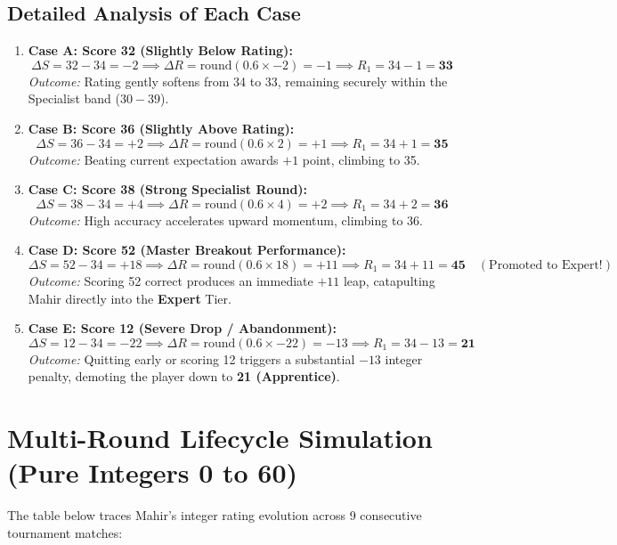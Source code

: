 \subsection{Detailed Analysis of Each Case}
\begin{enumerate}
    \item \textbf{Case A: Score 32 (Slightly Below Rating):}
    $$\Delta S = 32 - 34 = -2 \implies \Delta R = \text{round}(0.6 \times -2) = -1 \implies R_1 = 34 - 1 = \mathbf{33}$$
    \textit{Outcome:} Rating gently softens from 34 to 33, remaining securely within the Specialist band ($30-39$).

    \item \textbf{Case B: Score 36 (Slightly Above Rating):}
    $$\Delta S = 36 - 34 = +2 \implies \Delta R = \text{round}(0.6 \times 2) = +1 \implies R_1 = 34 + 1 = \mathbf{35}$$
    \textit{Outcome:} Beating current expectation awards $+1$ point, climbing to 35.

    \item \textbf{Case C: Score 38 (Strong Specialist Round):}
    $$\Delta S = 38 - 34 = +4 \implies \Delta R = \text{round}(0.6 \times 4) = +2 \implies R_1 = 34 + 2 = \mathbf{36}$$
    \textit{Outcome:} High accuracy accelerates upward momentum, climbing to 36.

    \item \textbf{Case D: Score 52 (Master Breakout Performance):}
    $$\Delta S = 52 - 34 = +18 \implies \Delta R = \text{round}(0.6 \times 18) = +11 \implies R_1 = 34 + 11 = \mathbf{45} \quad (\text{Promoted to Expert!})$$
    \textit{Outcome:} Scoring 52 correct produces an immediate $+11$ leap, catapulting Mahir directly into the \textbf{Expert} Tier.

    \item \textbf{Case E: Score 12 (Severe Drop / Abandonment):}
    $$\Delta S = 12 - 34 = -22 \implies \Delta R = \text{round}(0.6 \times -22) = -13 \implies R_1 = 34 - 13 = \mathbf{21}$$
    \textit{Outcome:} Quitting early or scoring 12 triggers a substantial $-13$ integer penalty, demoting the player down to \textbf{21 (Apprentice)}.
\end{enumerate}

\section{Multi-Round Lifecycle Simulation (Pure Integers 0 to 60)}
The table below traces Mahir's integer rating evolution across 9 consecutive tournament matches:

